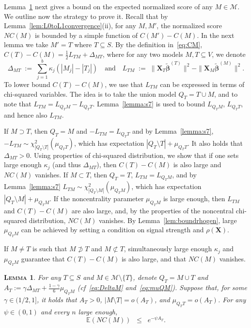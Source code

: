 \documentclass[
  12pt]{article}
\newcommand{\E}{\mathbb{E}}
\newcommand{\M}{\mathcal{M}}
\newcommand{\bbeta}{\boldsymbol{\beta}}
\newcommand{\bX}{\mathbf{X}}
\newtheorem{lem}[thm]{\textsc{Lemma}}
\begin{document}
Lemma~\ref{lem:boundexpnc} next gives a bound on the expected normalized score of any $M \in \M$. We outline now the strategy to prove it. Recall that by Lemma~\ref{lem:L0toL1convergence}(ii), for any $M,M'$, the normalized score $NC(M)$ is bounded by a simple function of $C(M')-C(M)$. In the next lemma we take $M'= T$ where $T\subseteq S$. By the definition in~\eqref{eq:CM}, $C(T)-C(M)=\tfrac12 L_{TM}+\Delta_{MT}$, where for any two models $M,T\subseteq V$, we denote
\begin{equation}\label{eq:DeltaM}
\Delta_{MT}\;:=\;\sum_{j=1}^b \kappa_j(|M_j|-|T_j|) \quad\text{and} \quad L_{TM}\;:=\;\|\bX_{T}\tilde{\bbeta}^{(T)}\|^2-\|\bX_{M}\tilde{\bbeta}^{(M)}\|^2.
\end{equation}
To lower bound $C(T)-C(M)$, we use that $L_{TM}$ can be expressed in terms of chi-squared variables.
The idea is to take the union model $Q_T=T\cup M$, and to note that $L_{TM}=L_{Q_TM}-L_{Q_TT}$. Lemma~\ref{lemma:s7} is used to bound $L_{Q_TM}$, $L_{Q_TT}$, and hence also $L_{TM}$.

If $M\supset T$, then $Q_T=M$ and $-L_{TM}=L_{Q_TT}$ and by Lemma~\ref{lemma:s7}, $-L_{TM}\sim \chi^2_{|Q_T\setminus T|}(\mu_{Q_TT})$, which has expectation $|Q_T\setminus T|+\mu_{Q_TT}$. It also holds that $\Delta_{MT}>0$. Using properties of chi-squared distribution, we show that if one sets large enough $\kappa_j$ (and thus $\Delta_{MT}$), then $C(T)-C(M)$ is also large and $NC(M)$ vanishes. If $M\subset T$, then $Q_T=T$, $L_{TM}=L_{Q_TM}$, and by Lemma~\ref{lemma:s7}
$L_{TM}\sim \chi^2_{|Q_T\setminus M|}(\mu_{Q_TM})$, which has expectation $|Q_T\setminus M|+\mu_{Q_TM}$.
If the noncentrality parameter $\mu_{Q_TM}$ is large enough, then $L_{TM}$ and $C(T)-C(M)$ are also large, and, by the properties of the noncentral chi-squared distribution, $NC(M)$ vanishes. By Lemma~\ref{lem:boundrhogen}, large $\mu_{Q_TM}$ can be achieved by setting a condition on signal strength and $\rho(\bX)$.

If $M\neq T$ is such that $M\not\supset T$ and $M\not\subset T$, simultaneously large enough $\kappa_j$ and $\mu_{Q_T M}$ guarantee that $C(T)-C(M)$ is also large, and that $NC(M)$ vanishes.

\begin{lem}\label{lem:boundexpnc} For any $T\subseteq S$ and $M\in \M\setminus\{T\}$, denote $Q_T= M\cup T$ and $A_T:=\gamma\Delta_{MT}+\tfrac{1-\gamma}{6}\mu_{Q_TM}$ (\emph{cf}~\eqref{eq:DeltaM} and~\eqref{eq:muQM}). Suppose that, for some $\gamma \in (1/2,1]$, it holds that $A_T>0$, $|M\setminus T|=o(A_T)$, and $\mu_{Q_T T}=o(A_T)$. For any $\psi\in(0,1)$ and every $n$ large enough,
$$\E\left(NC(M)\right)  \;\;\leq\;\; e^{-\psi A_T}.$$
\end{lem}
\end{document}
